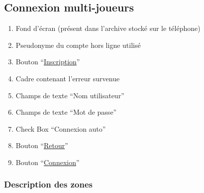 \documentclass{report}
\begin{document}
\newpage

	\subsection{Connexion multi-joueurs}
	
		\hypertarget{Connexion multi-joueurs}{}
		\label{Connexion multi-joueurs}
	
		\begin{center}
					
		\end{center}
		
		\begin{enumerate}
		  \item Fond d'écran (présent dans l'archive stocké sur le téléphone)
		  \item Pseudonyme du compte hors ligne utilisé
		  \item Bouton ``\hyperlink{Creation compte multi-joueurs}{Inscription}''
		  \item Cadre contenant l'erreur survenue
		  \item Champs de texte ``Nom utilisateur''
		  \item Champs de texte ``Mot de passe''
		  \item Check Box ``Connexion auto''
		  \item Bouton ``\hyperlink{Page d'accueil}{Retour}''
		  \item Bouton ``\hyperlink{Accueil multi-joueurs}{Connexion}''
		\end{enumerate}

		\subsubsection{Description des zones}
		
\end{document}
